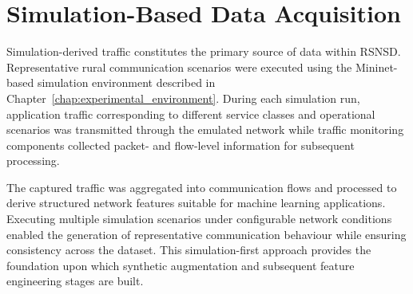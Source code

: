 \documentclass[12pt,a4paper]{report}
\begin{document}

	
	\section{Simulation-Based Data Acquisition}
	\label{sec:simulation_generation}
	
	Simulation-derived traffic constitutes the primary source of data within RSNSD. Representative rural communication scenarios were executed using the Mininet-based simulation environment described in Chapter~\ref{chap:experimental_environment}. During each simulation run, application traffic corresponding to different service classes and operational scenarios was transmitted through the emulated network while traffic monitoring components collected packet- and flow-level information for subsequent processing.
	
	The captured traffic was aggregated into communication flows and processed to derive structured network features suitable for machine learning applications. Executing multiple simulation scenarios under configurable network conditions enabled the generation of representative communication behaviour while ensuring consistency across the dataset. This simulation-first approach provides the foundation upon which synthetic augmentation and subsequent feature engineering stages are built.
	
\end{document}
